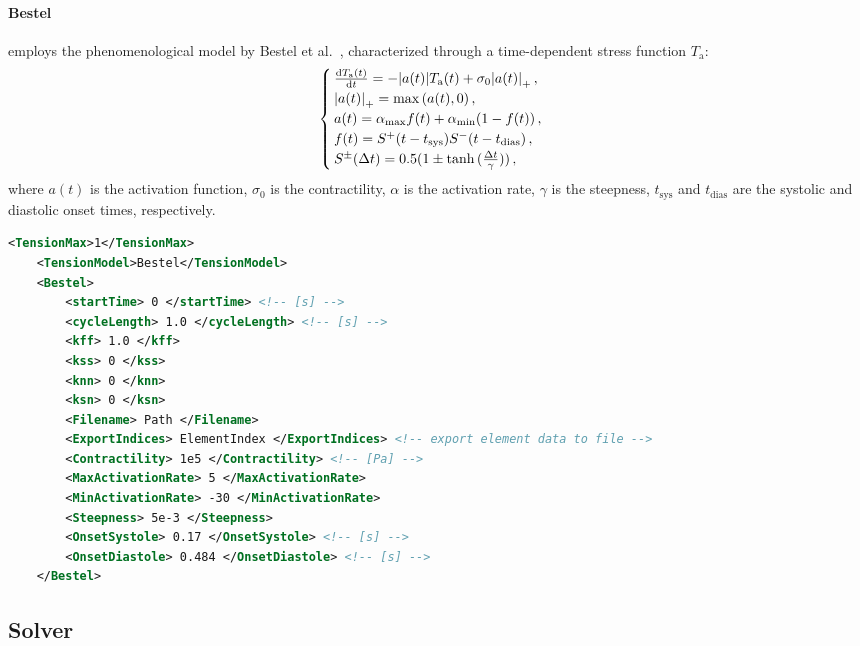 \paragraph{Bestel} employs the phenomenological model by Bestel et al.~\cite{Bestel}, characterized through a time-dependent stress function $T_\mathrm{a}$:
\begin{equation}
    \begin{cases}
        \dv{T_\mathrm{a}(t)}{t} = -\abs{a(t)} T_\mathrm{a}(t) + \sigma_0 \abs{a(t)}_+ \,, \\
        \abs{a(t)}_+ = \max{(a(t),0)} \,, \\
        a(t) = \alpha_\mathrm{max} f(t) + \alpha_\mathrm{min} (1 - f(t)) \,, \\
        f(t) = S^+(t - t_\mathrm{sys}) S^-(t - t_\mathrm{dias}) \,, \\
        S^\pm(\Delta t) = 0.5 (1 \pm \tanh{(\frac{\Delta t}{\gamma})}) \,,
    \end{cases} \label{eq:Bestel}
\end{equation}
where $a(t)$ is the activation function, $\sigma_0$ is the contractility, $\alpha$ is the activation rate, $\gamma$ is the steepness, $t_\mathrm{sys}$ and $t_\mathrm{dias}$ are the systolic and diastolic onset times, respectively.

\begin{lstlisting}[language=XML,caption=.xml settings for the Bestel tension model]
    <TensionMax>1</TensionMax>
    <TensionModel>Bestel</TensionModel>
    <Bestel>
        <startTime> 0 </startTime> <!-- [s] -->
        <cycleLength> 1.0 </cycleLength> <!-- [s] -->
        <kff> 1.0 </kff>
        <kss> 0 </kss>
        <knn> 0 </knn>
        <ksn> 0 </ksn>
        <Filename> Path </Filename>
        <ExportIndices> ElementIndex </ExportIndices> <!-- export element data to file -->
        <Contractility> 1e5 </Contractility> <!-- [Pa] -->
        <MaxActivationRate> 5 </MaxActivationRate>
        <MinActivationRate> -30 </MinActivationRate>
        <Steepness> 5e-3 </Steepness>
        <OnsetSystole> 0.17 </OnsetSystole> <!-- [s] -->
        <OnsetDiastole> 0.484 </OnsetDiastole> <!-- [s] -->
    </Bestel>
\end{lstlisting}

\subsection{Solver}
\label{settings:Solver}

